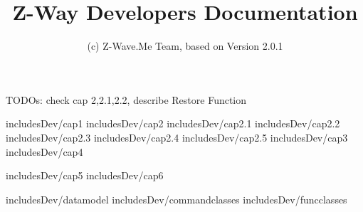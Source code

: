 \documentclass[10pt]{book}
\title{Z-Way Developers Documentation}
\author{(c) Z-Wave.Me Team, based on Version 2.0.1}
\date{}
\begin{document}
\maketitle
\tableofcontents


TODOs: check cap 2,2.1,2.2, describe Restore Function 

 {includesDev/cap1} 
 {includesDev/cap2} %
 {includesDev/cap2.1} %
 {includesDev/cap2.2} %
 {includesDev/cap2.3} %
 {includesDev/cap2.4} %
 {includesDev/cap2.5} %
 {includesDev/cap3} %
 {includesDev/cap4} %

 {includesDev/cap5} %
 {includesDev/cap6} %

 {includesDev/datamodel}
 {includesDev/commandclasses} 
 {includesDev/funcclasses}
\end{document}
